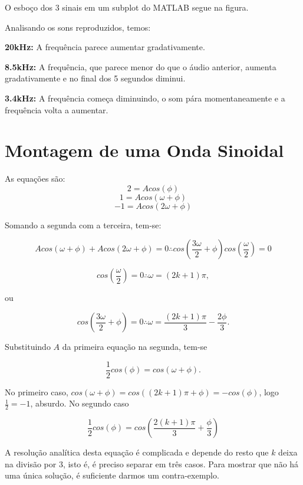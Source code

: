 \documentclass[a4paper, 12pt]{article}
\begin{document}
O esboço dos 3 sinais em um subplot do MATLAB segue na figura.

Analisando os sons reproduzidos, temos:

\textbf{20kHz:} A frequência parece aumentar gradativamente. 

\textbf{8.5kHz:} A frequência, que parece menor do que o áudio anterior, aumenta gradativamente e no final dos 5 segundos diminui.

\textbf{3.4kHz:} A frequência começa diminuindo, o som pára momentaneamente e a frequência volta a aumentar.

%


\section{Montagem de uma Onda Sinoidal}

As equações são:
$$2=Acos(\phi)$$
$$1=Acos(\omega +\phi)$$
$$-1=Acos(2\omega +\phi)$$

Somando a segunda com a terceira, tem-se:

$$Acos(\omega +\phi) + Acos(2\omega +\phi) = 0 \therefore cos(\frac{3\omega}{2} + \phi)cos(\frac{\omega}{2})=0$$

$$cos(\frac{\omega}{2})=0 \therefore \omega = (2k+1)\pi, $$

ou

$$cos(\frac{3\omega}{2} + \phi)=0 \therefore \omega = \frac{(2k+1)\pi}{3} - \frac{2\phi}{3}.$$

Substituindo $A$ da primeira equação na segunda, tem-se

$$\frac{1}{2}cos(\phi)=cos(\omega + \phi).$$

No primeiro caso, $cos(\omega + \phi)=cos((2k+1)\pi + \phi)=-cos(\phi)$, logo $\frac{1}{2}=-1$, absurdo. No segundo caso

$$\frac{1}{2}cos(\phi) = cos(\frac{2(k+1)\pi}{3} + \frac{\phi}{3})$$

A resolução analítica desta equação é complicada e depende do resto que $k$ deixa na divisão por $3$, isto é, é preciso separar em três casos. Para mostrar que não há uma única solução, é suficiente darmos um contra-exemplo. 
\end{document}

